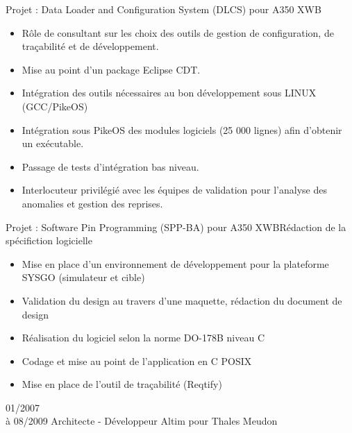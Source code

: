\documentclass[10pt,a4paper]{moderncv}       %
\begin{document}
{
Projet : Data Loader and Configuration System (DLCS) pour A350 XWB
\begin{itemize}
\setlength{\itemindent}{2mm}
  \item Rôle  de consultant sur les choix des outils de gestion de configuration, de traçabilité et de développement.
  \item Mise au point d’un package Eclipse CDT.
  \item Intégration des outils nécessaires au bon développement sous LINUX (GCC/PikeOS)
  \item Intégration sous PikeOS des modules logiciels (25 000 lignes) afin d'obtenir un exécutable.
  \item Passage de tests d'intégration bas niveau.
  \item Interlocuteur privilégié avec les équipes de validation pour l'analyse des anomalies et gestion des reprises.
\end{itemize}
Projet : Software Pin Programming (SPP-BA) pour A350 XWBRédaction de la
spécifiction logicielle
\begin{itemize}
\setlength{\itemindent}{2mm}
  \item Mise en place d'un environnement de développement pour la plateforme SYSGO (simulateur et cible)
  \item Validation du design au travers d'une maquette, rédaction du document de design
  \item Réalisation du logiciel selon la norme DO-178B niveau C
  \item Codage et mise au point de l’application en C POSIX
  \item Mise en place de l’outil de traçabilité (Reqtify)
\end{itemize}
}
\vspace*{3mm}
\cventry
{01/2007\\à 08/2009}       %
{Architecte - Développeur} %
{Altim pour Thales}        %
{Meudon}                   %
{}                         %
\end{document}
